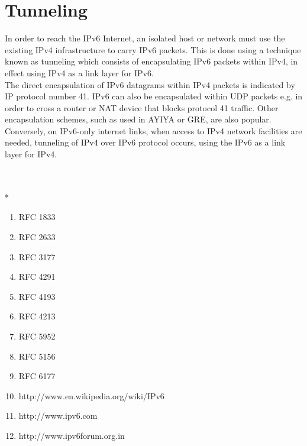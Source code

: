 \documentclass[12pt]{article}
\begin{document}
\section{Tunneling}
In order to reach the IPv6 Internet, an isolated host or network must use the existing IPv4 infrastructure to carry IPv6 packets. This is done using a technique known as tunneling which consists of encapsulating IPv6 packets within IPv4, in effect using IPv4 as a link layer for IPv6.\\
The direct encapsulation of IPv6 datagrams within IPv4 packets is indicated by IP protocol number 41. IPv6 can also be encapsulated within UDP packets e.g. in order to cross a router or NAT device that blocks protocol 41 traffic. Other encapsulation schemes, such as used in AYIYA or GRE, are also popular.\\
Conversely, on IPv6-only internet links, when access to IPv4 network facilities are needed, tunneling of IPv4 over IPv6 protocol occurs, using the IPv6 as a link layer for IPv4.
\setcounter{section}{0}
\newpage

\\\\*
\begin{enumerate}
\item{RFC 1833}\\
\item{RFC 2633}\\
\item{RFC 3177}\\
\item{RFC 4291}\\
\item{RFC 4193}\\
\item{RFC 4213}\\
\item{RFC 5952}\\
\item{RFC 5156}\\
\item{RFC 6177}\\
\item{http://www.en.wikipedia.org/wiki/IPv6}\\
\item{http://www.ipv6.com}\\
\item{http://www.ipv6forum.org.in}

\end{enumerate}
\end{document}
